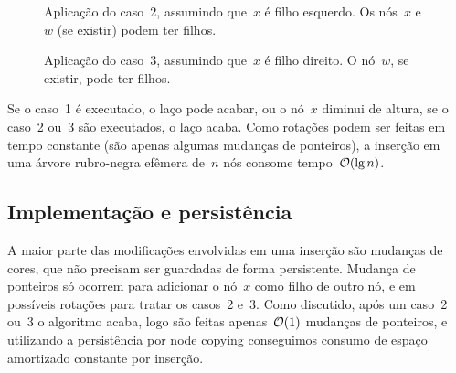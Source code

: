 \documentclass[main.tex]{subfiles}
\begin{document}
\begin{figure}
\centering
{}
\caption{Aplicação do caso~2, assumindo que~$x$ é filho esquerdo. Os nós~$x$ e~$w$ (se existir) podem ter filhos.} \label{fig:rb_ins_caso2}
\end{figure}

\begin{figure}
\centering
{}
\caption{Aplicação do caso~3, assumindo que~$x$ é filho direito. O nó~$w$, se existir, pode ter filhos.} \label{fig:rb_ins_caso3}
\end{figure}

Se o caso~1 é executado, o laço pode acabar, ou o nó~$x$ diminui de altura, se o caso~2 ou~3 são executados, o laço acaba. Como rotações podem ser feitas em tempo constante (são apenas algumas mudanças de ponteiros), a inserção em uma árvore rubro-negra efêmera de~$n$ nós consome tempo~$\mathcal{O}(\lg n)$.

\subsection{Implementação e persistência}

A maior parte das modificações envolvidas em uma inserção são mudanças de cores, que não precisam ser guardadas de forma persistente. Mudança de ponteiros só ocorrem para adicionar o nó~$x$ como filho de outro nó, e em possíveis rotações para tratar os casos~2 e~3. Como discutido, após um caso~2 ou~3 o algoritmo acaba, logo são feitas apenas~$\mathcal{O}(1)$ mudanças de ponteiros, e utilizando a persistência por node copying conseguimos consumo de espaço amortizado constante por inserção.
\end{document}
